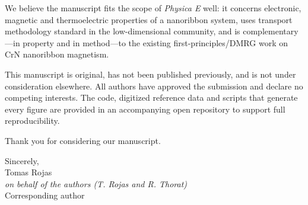 \documentclass[11pt]{article}
\begin{document}
We believe the manuscript fits the scope of \textit{Physica E} well: it concerns electronic,
magnetic and thermoelectric properties of a nanoribbon system, uses transport methodology
standard in the low-dimensional community, and is complementary---in property and in method---to
the existing first-principles/DMRG work on CrN nanoribbon magnetism.

This manuscript is original, has not been published previously, and is not under consideration
elsewhere. All authors have approved the submission and declare no competing interests. The
code, digitized reference data and scripts that generate every figure are provided in an
accompanying open repository to support full reproducibility.

Thank you for considering our manuscript.

\vspace{1em}
\noindent Sincerely,\\
Tomas Rojas\\
\textit{on behalf of the authors (T. Rojas and R. Thorat)}\\
Corresponding author
\end{document}
